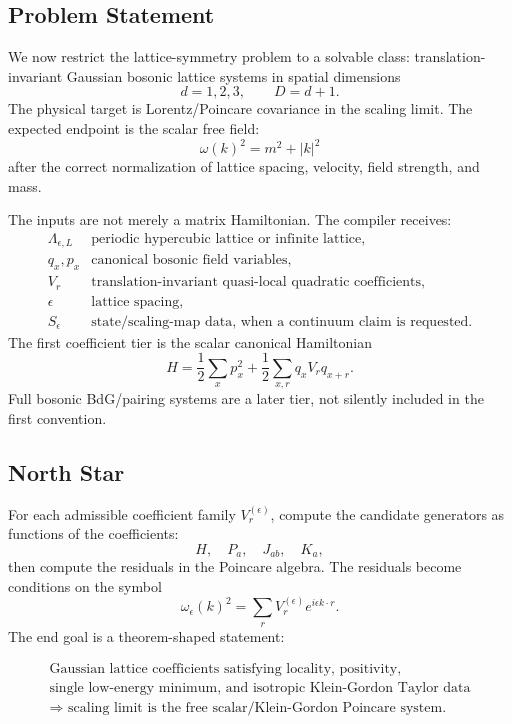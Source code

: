 \subsection{Problem Statement}

We now restrict the lattice-symmetry problem to a solvable class:
translation-invariant Gaussian bosonic lattice systems in spatial dimensions
\[
  d=1,2,3,
  \qquad D=d+1.
\]
The physical target is Lorentz/Poincare covariance in the scaling limit.  The
expected endpoint is the scalar free field:
\[
  \omega(k)^2=m^2+|k|^2
\]
after the correct normalization of lattice spacing, velocity, field strength,
and mass.

The inputs are not merely a matrix Hamiltonian.  The compiler receives:
\[
\begin{array}{ll}
\Lambda_{\epsilon,L} & \text{periodic hypercubic lattice or infinite lattice},\\
q_x,p_x & \text{canonical bosonic field variables},\\
V_r & \text{translation-invariant quasi-local quadratic coefficients},\\
\epsilon & \text{lattice spacing},\\
S_\epsilon & \text{state/scaling-map data, when a continuum claim is requested}.
\end{array}
\]
The first coefficient tier is the scalar canonical Hamiltonian
\[
  H=\frac{1}{2}\sum_xp_x^2+\frac{1}{2}\sum_{x,r}q_xV_rq_{x+r}.
\]
Full bosonic BdG/pairing systems are a later tier, not silently included in the
first convention.

\subsection{North Star}

For each admissible coefficient family \(V^{(\epsilon)}_r\), compute the
candidate generators as functions of the coefficients:
\[
  H,\quad P_a,\quad J_{ab},\quad K_a,
\]
then compute the residuals in the Poincare algebra.  The residuals become
conditions on the symbol
\[
  \omega_\epsilon(k)^2=\sum_rV^{(\epsilon)}_r e^{i\epsilon k\cdot r}.
\]
The end goal is a theorem-shaped statement:

\[
\begin{gathered}
\text{Gaussian lattice coefficients satisfying locality, positivity,}\\
\text{single low-energy minimum, and isotropic Klein-Gordon Taylor data}
\\
\Longrightarrow
\text{ scaling limit is the free scalar/Klein-Gordon Poincare system.}
\end{gathered}
\]

